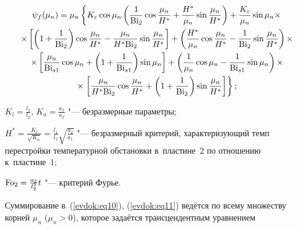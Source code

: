 \begin{multline}

\psi _f (\mu _n ) = \mu _n \left\{ {K_\varepsilon \cos \mu _n \left( 

{\frac{1}{{\rm Bi}_2 }\cos \frac{\mu _n }{H^\ast } + \frac{H^\ast }{\mu _n }\sin 

\frac{\mu _n }{H^\ast }} \right) + \frac{K_\varepsilon }{\mu _n }\sin \mu _n 

\times } \right. 

\\

\times \left[ {\left( {1 + \frac{1}{{\rm Bi}_2 }} \right)\cos \frac{\mu _n 

}{H^\ast } - \frac{\mu _n }{H^\ast {\rm Bi}_2 }\sin \frac{\mu _n }{H^\ast }} 

\right] + \left( {\frac{H^\ast }{\mu _n }\cos \frac{\mu _n }{H^\ast } - 

\frac{1}{{\rm Bi}_2 }\sin \frac{\mu _n }{H^\ast }} \right)\times 

\\

\times \left[ {\frac{\mu _n }{{\rm Bi}_{s1} }\cos \mu _n + \left( {1 + 

\frac{1}{{\rm Bi}_{s1} }} \right)\sin \mu _n } \right] + \left( {\frac{1}{\mu _n 

}\cos \mu _n - \frac{1}{{\rm Bi}_{s1} }\sin \mu _n } \right)\times 

\\

\times \left. {\left[ {\frac{\mu _n }{H^\ast {\rm Bi}_2 }\cos \frac{\mu _n 

}{H^\ast } + \left( {1 + \frac{1}{{\rm Bi}_2 }} \right)\sin \frac{\mu _n }{H^\ast 

}} \right]} \right\};

\label{evdok:eq12}

\end{multline}

$K_l = \frac{l_1 }{l_2 }$, $K_a = \frac{a_1 }{a_2 }$ "---  безразмерные параметры;

$ H^\ast = \frac{K_l }{\sqrt {K_a } } = \frac{l_1 }{l_2 }\sqrt {\frac{a_2 

}{a_1 }}$ "--- безразмерный критерий, характеризующий темп перестройки температурной обстановки в~пластине~2 по отношению к~пластине~1;

${\rm Fo}_2 = \frac{a_2 }{l_2^2 }t$ "--- критерий Фурье.



Суммирование в~(\ref{evdok:eq10}), (\ref{evdok:eq11}) ведётся по всему множеству корней $\mu _n$ ($\mu _n > 0$), которое задаётся трансцендентным уравнением

